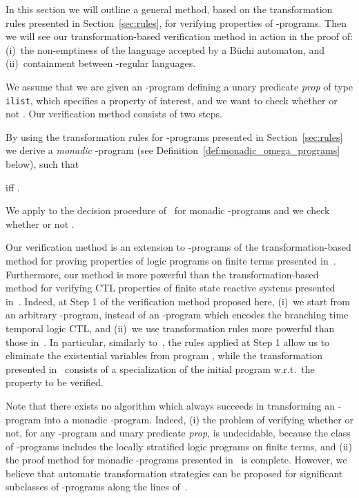 \documentclass[english]{tlp}
\begin{document}
In this section we will outline a general method, based on the
transformation rules presented in Section~\ref{sec:rules},
for verifying properties of -programs.
Then we will see our transformation-based
verification method in action in the proof of: (i)~the
non-emptiness of the language accepted by a B\"{u}chi automaton, 
and (ii)~containment between -regular languages.

We assume that we are given an -program  
defining a unary predicate {\it prop} of type {\tt ilist},
which specifies a property of interest,
and we want to check whether or not .
Our verification method consists of two steps. 

\smallskip

By using the transformation rules for  -programs presented in 
Section~\ref{sec:rules} we derive a {\em monadic} -program 
(see Definition~\ref{def:monadic_omega_programs} below), such that

 iff .

\smallskip

We apply to  the decision procedure of~\cite{Pe&09b} for
monadic -programs and we check whether or not 
.

\smallskip

Our verification method is an extension to -programs of
the transformation-based method for proving properties of logic programs on
finite terms presented in~\cite{PeP00a}. 
Furthermore, our method is more powerful than the transformation-based
method for verifying CTL properties of finite state reactive
systems presented in~\cite{Pe&09b}. Indeed, at Step 1 of the verification
method proposed here,
(i)~we start from an arbitrary -program,
instead of an -program which encodes the
branching time temporal logic CTL, and 
(ii)~we use transformation rules more powerful than those in~\cite{Pe&09b}.
In particular, similarly to~\cite{PeP00a}, the rules
applied at Step 1 allow us to
eliminate the existential variables from program , while the
transformation presented in~\cite{Pe&09b} consists of a specialization
of the initial program w.r.t.~the property to be verified.

Note that there exists no algorithm which always succeeds in transforming an
\mbox{-program} into a monadic -program.
Indeed, (i) the problem of verifying whether or not, for any -program
 and unary predicate {\it prop},
 is undecidable, 
because the class of \mbox{-programs} includes
the locally stratified logic programs on finite terms,
and (ii) the proof method for monadic
-programs presented in~\cite{Pe&09b} is complete.
However, we believe that automatic transformation strategies
can be proposed for significant subclasses of \mbox{-programs} along the lines 
of~\cite{PrP95a,PeP00a}.
\end{document}

